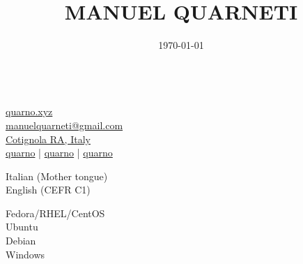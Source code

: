 \documentclass{article}
\title{\HUGE \bfseries MANUEL QUARNETI \\[-20pt]}
\author{}
\date{\today}
\begin{document}
\setmainfont{Inter}

\setlength{\columnsep}{20pt}
\begin{paracol}{2}

\begin{tcolorbox}[colback=white]
    \small \center

    \vspace{20pt}

     \\[20pt]

    \href{https://quarno.xyz/}{ quarno.xyz} \\[8pt]
    \href{mailto:manuelquarneti@gmail.com}{ manuelquarneti@gmail.com} \\[8pt]
    \href{https://www.openstreetmap.org/relation/43112}{ Cotignola RA, Italy} \\[8pt]
    \href{https://github.com/quarno}{ quarno} \hfill | \hfill
    \href{https://www.linkedin.com/in/quarno}{ quarno} \hfill | \hfill
    \href{https://t.me/quarno}{ quarno}
\end{tcolorbox}

\vspace{40pt}

\begin{tcolorbox}[title=\emoji{speaking-head} Languages,colback=white]
     Italian (Mother tongue) \\[4pt]
     English (CEFR C1)
\end{tcolorbox}

\begin{tcolorbox}[title=\emoji{desktop-computer} Operating Systems,colback=white]
     Fedora/RHEL/CentOS \\[4pt]
     Ubuntu \\[4pt]
     Debian \\[4pt]
     Windows
\end{tcolorbox}


\end{paracol}
\end{document}

